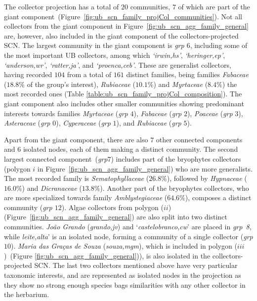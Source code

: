 The collector projection has a total of $20$ communities, $7$ of which are part of the giant component~(Figure~\ref{fig:ub_scn_family_projCol_communities}). 
Not all collectors from the giant component in Figure~\ref{fig:ub_scn_agg_family_general} are, however, also included in the giant component of the collectors-projected SCN.
The largest community in the giant component is \textit{grp $6$}, including some of the most important UB collectors, among which \textit{`irwin,hs'}, \textit{`heringer,ep'}, \textit{`anderson,wr'}, \textit{`ratter,ja'}, and \textit{`proenca,ceb'}.
These are generalist collectors, having recorded $104$ from a total of $161$ distinct families, being families \textit{Fabaceae} ($18.8\%$ of the group's interest), \textit{Rubiaceae} ($10.1\%$) and \textit{Myrtaceae} ($8.4\%$) the most recorded ones (Table \ref{table:ub_scn_family_projCol_composition}). 
%
The giant component also includes other smaller communities showing predominant interests towards families \textit{Myrtaceae} (\textit{grp} $4$), \textit{Fabaceae} (\textit{grp} $2$), \textit{Poaceae} (\textit{grp} $3$), \textit{Asteraceae} (\textit{grp} $0$), \textit{Cyperaceae} (\textit{grp} $1$), and \textit{Rubiaceae} (\textit{grp} $5$).

Apart from the giant component, there are also $7$ other connected components and $6$ isolated nodes, each of them making a distinct community.
The second largest connected component~(\textit{grp{$7$}}) includes part of the bryophytes collectors (polygon $i$ in Figure~\ref{fig:ub_scn_agg_family_general}) who are more generalists.
The most recorded family is \textit{Sematophyllaceae} ($26.8\%$), followed by \textit{Hypnaceae} ($16.0\%$) and \textit{Dicranaceae} ($13.8\%$). 
Another part of the bryophytes collectors, who are more specialized towards family \textit{Amblystegiaceae} ($64.6\%$), composes a distinct community (\textit{grp $12$}).
%
Algae collectors from polygon ($ii$) (Figure~\ref{fig:ub_scn_agg_family_general}) are also split into two distinct communities.
\textit{João Grando} (\textit{grando,jv}) and `\textit{castelobranco,cw}' are placed in \textit{grp~8}, while \textit{leite,alta}' is an isolated node, forming a community of a single collector (\textit{grp $10$}).
\textit{Maria das Graças de Souza} (\textit{souza,mgm}), which is included in polygon ($iii$)~(Figure \ref{fig:ub_scn_agg_family_general})), is also isolated in the collectors-projected SCN.
The last two collectors mentioned above have very particular taxonomic interests, and are represented as isolated nodes in the projection as they show no strong enough species bags similarities with any other collector in the herbarium.

